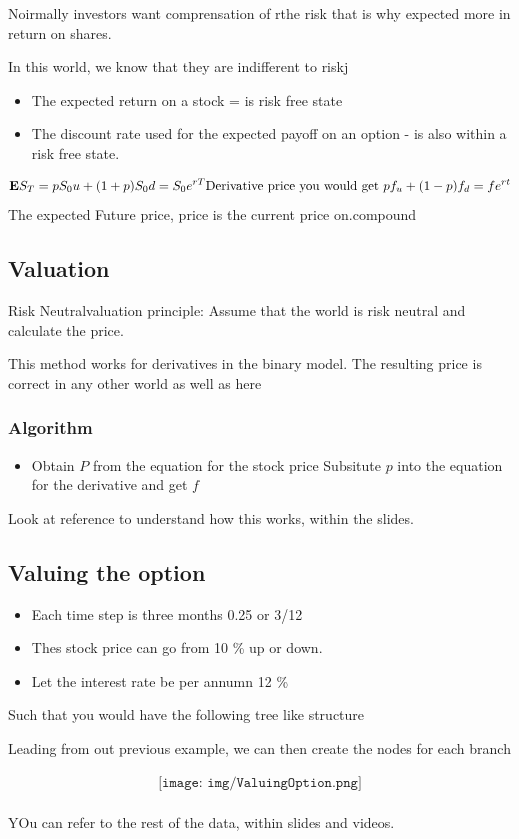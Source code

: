 \documentclass{article}
\theoremstyle{mytheoremstyle}
\theoremstyle{mytheoremstyle}
\theoremstyle{myproblemstyle}
\begin{document}
\begin{definition}
	Noirmally investors want comprensation of rthe risk that is why expected more in return on shares.

	In this world, we know that they are indifferent to riskj

	\begin{itemize}
		\item The expected return on a stock = is risk free state
		\item The discount rate used for the expected payoff on an option - is also within a risk free state.
	\end{itemize}


	\begin{displaymath}

		\mathbf{E}S_T = pS_0u + (1+p)S_0d = S_0e^{rT}\\
		\\
		\\
		\text{Derivative price you would get }
		pf_u + (1 - p) f_d = fe^{rt}
	\end{displaymath}
	The expected Future price, price is the current price on.compound
\end{definition}


\subsection{Valuation}
Risk Neutralvaluation principle:
Assume that the world is risk neutral and calculate the price.

This method works for derivatives in the binary model. The resulting price is correct in any other world as well as here

\subsubsection{Algorithm}
\begin{itemize}
	\item  Obtain $P$ from the equation for the stock price
	      \teim Subsitute $p$ into the equation for the derivative and get $f$
\end{itemize}

Look at reference to understand how this works, within the slides.

\subsection{Valuing the option}
\begin{itemize}
	\item Each time step is three months 0.25 or 3/12
	\item Thes stock price can go from 10 \% up or down.
	\item Let the interest rate be per annumn 12 \%
\end{itemize}


Such that you would have the following tree like structure

Leading from out previous example, we can then create the nodes for each branch

\begin{align}
	\texttt{[image: img/ValuingOption.png]}
\end{align}
\\ YOu can refer to the rest of the data, within slides and videos.
\end{document}
